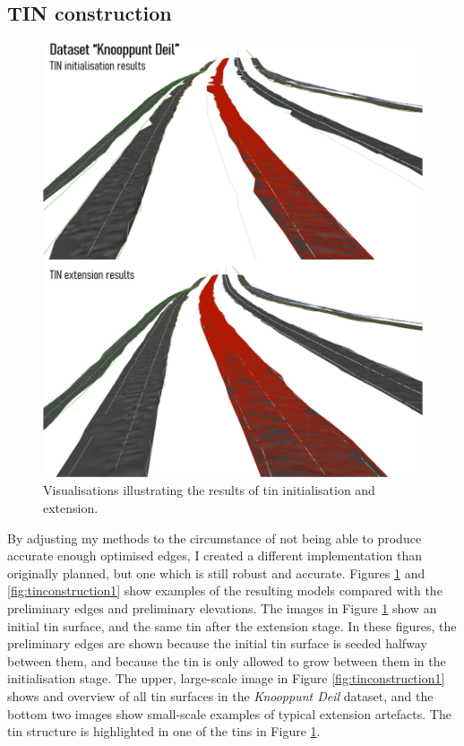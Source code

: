 \subsection{TIN construction}
\label{sub:r_tinconstruction}

\begin{figure}
    \centering
    \includegraphics[width=\linewidth]{final_report/figs/tinconstruction0.png}
    \caption{Visualisations illustrating the results of \ac{tin} initialisation and extension.}
    \label{fig:tinconstruction0}
\end{figure}

By adjusting my methods to the circumstance of not being able to produce accurate enough optimised edges, I created a different implementation than originally planned, but one which is still robust and accurate. Figures \ref{fig:tinconstruction0} and \ref{fig:tinconstruction1} show examples of the resulting models compared with the preliminary edges and preliminary elevations. The images in Figure \ref{fig:tinconstruction0} show an initial \ac{tin} surface, and the same \ac{tin} after the extension stage. In these figures, the preliminary edges are shown because the initial \ac{tin} surface is seeded halfway between them, and because the \ac{tin} is only allowed to grow between them in the initialisation stage. The upper, large-scale image in Figure \ref{fig:tinconstruction1} shows and overview of all \ac{tin} surfaces in the \textit{Knooppunt Deil} dataset, and the bottom two images show small-scale examples of typical extension artefacts. The \ac{tin} structure is highlighted in one of the \ac{tin}s in Figure \ref{fig:tinconstruction0}.

